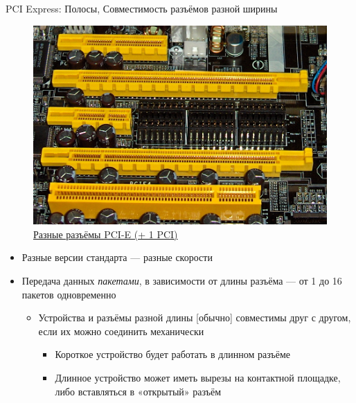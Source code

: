 \documentclass[xetex,aspectratio=43]{beamer}
\begin{document}
\begin{frame}{PCI Express: Полосы, Совместимость разъёмов разной ширины}
	\begin{figure}
        \includegraphics[height=0.5\textheight]{img/04.PCI-E_PCI_slots.jpg}
        \caption{\href{https://en.wikipedia.org/wiki/PCI_Express}{Разные разъёмы PCI-E (+ 1 PCI)}}
    \end{figure}
    \begin{itemize}
        \item Разные версии стандарта --- разные скорости
        \item Передача данных \emph{пакетами}, в зависимости от длины разъёма --- от 1 до 16 пакетов одновременно
        \begin{itemize}
            \item Устройства и разъёмы разной длины [обычно] совместимы друг с другом, если их можно соединить механически
            \begin{itemize}
                \item Короткое устройство будет работать в длинном разъёме
                \item Длинное устройство может иметь вырезы на контактной площадке, либо вставляться в «открытый» разъём
            \end{itemize}
        \end{itemize}
    \end{itemize}
\end{frame}
\end{document}
